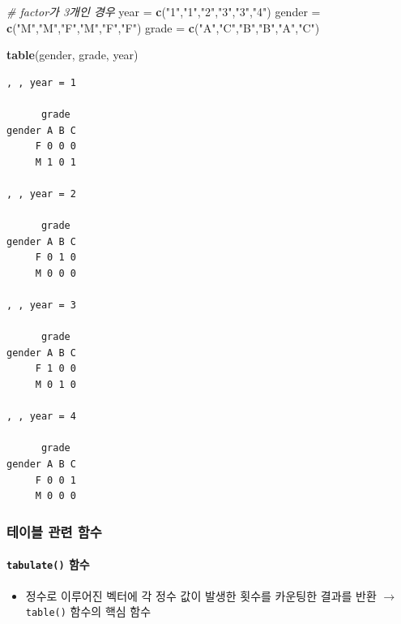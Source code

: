 \documentclass[
  11pt,
]{krantz}
\newenvironment{Shaded}{\begin{snugshade}}{\end{snugshade}}
\newcommand{\CommentTok}[1]{\textcolor[rgb]{0.37,0.37,0.37}{\textit{#1}}}
\newcommand{\KeywordTok}[1]{\textcolor[rgb]{0.27,0.27,0.27}{\textbf{#1}}}
\newcommand{\NormalTok}[1]{#1}
\newcommand{\StringTok}[1]{\textcolor[rgb]{0.5,0.5,0.5}{#1}}
\providecommand{\tightlist}{%
  \setlength{\itemsep}{0pt}\setlength{\parskip}{0pt}}
\begin{document}
\begin{Shaded}
\begin{Highlighting}[]
\CommentTok{# factor가 3개인 경우}
\NormalTok{year =}\StringTok{ }\KeywordTok{c}\NormalTok{(}\StringTok{"1"}\NormalTok{,}\StringTok{"1"}\NormalTok{,}\StringTok{"2"}\NormalTok{,}\StringTok{"3"}\NormalTok{,}\StringTok{"3"}\NormalTok{,}\StringTok{"4"}\NormalTok{)}
\NormalTok{gender =}\StringTok{ }\KeywordTok{c}\NormalTok{(}\StringTok{"M"}\NormalTok{,}\StringTok{"M"}\NormalTok{,}\StringTok{"F"}\NormalTok{,}\StringTok{"M"}\NormalTok{,}\StringTok{"F"}\NormalTok{,}\StringTok{"F"}\NormalTok{)}
\NormalTok{grade =}\StringTok{ }\KeywordTok{c}\NormalTok{(}\StringTok{"A"}\NormalTok{,}\StringTok{"C"}\NormalTok{,}\StringTok{"B"}\NormalTok{,}\StringTok{"B"}\NormalTok{,}\StringTok{"A"}\NormalTok{,}\StringTok{"C"}\NormalTok{)}

\KeywordTok{table}\NormalTok{(gender, grade, year)}
\end{Highlighting}
\end{Shaded}

\begin{verbatim}
, , year = 1

      grade
gender A B C
     F 0 0 0
     M 1 0 1

, , year = 2

      grade
gender A B C
     F 0 1 0
     M 0 0 0

, , year = 3

      grade
gender A B C
     F 1 0 0
     M 0 1 0

, , year = 4

      grade
gender A B C
     F 0 0 1
     M 0 0 0
\end{verbatim}

\normalsize

\hypertarget{tab-related-fun}{%
\subsubsection*{테이블 관련 함수}\label{tab-related-fun}}


\hypertarget{tab-fun1}{%
\paragraph{\texorpdfstring{\texttt{tabulate()} 함수}{tabulate() 함수}}\label{tab-fun1}}

\begin{itemize}
\tightlist
\item
  정수로 이루어진 벡터에 각 정수 값이 발생한 횟수를 카운팅한 결과를 반환 \(\rightarrow\) \texttt{table()} 함수의 핵심 함수
\end{itemize}
\end{document}
